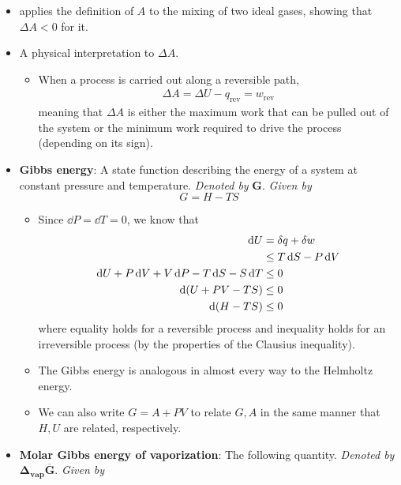 \documentclass[../notes.tex]{subfiles}
\begin{document}
\begin{itemize}
\begin{itemize}
    \end{itemize}
    \item \textcite{bib:McQuarrieSimon} applies the definition of $A$ to the mixing of two ideal gases, showing that $\Delta A<0$ for it.
    \item A physical interpretation to $\Delta A$.
    \begin{itemize}
        \item When a process is carried out along a reversible path,
        \begin{align*}
            \Delta A = \Delta U-q_\text{rev} = w_\text{rev}
        \end{align*}
        meaning that $\Delta A$ is either the maximum work that can be pulled out of the system or the minimum work required to drive the process (depending on its sign).
    \end{itemize}
    \item \textbf{Gibbs energy}: A state function describing the energy of a system at constant pressure and temperature. \emph{Denoted by} $\bm{G}$. \emph{Given by}
    \begin{equation*}
        G = H-TS
    \end{equation*}
    \begin{itemize}
        \item Since $\dd{P}=\dd{T}=0$, we know that
        \begin{align*}
            \dd{U} &= \var{q}+\var{w}\\
            &\leq T\dd{S}-P\dd{V}\\
            \dd{U}+P\dd{V}+V\dd{P}-T\dd{S}-S\dd{T} &\leq 0\\
            \dd{(U+PV-TS)} &\leq 0\\
            \dd{(H-TS)} &\leq 0
        \end{align*}
        where equality holds for a reversible process and inequality holds for an irreversible process (by the properties of the Clausius inequality).
        \item The Gibbs energy is analogous in almost every way to the Helmholtz energy.
        \item We can also write $G=A+PV$ to relate $G,A$ in the same manner that $H,U$ are related, respectively.
    \end{itemize}
    \item \textbf{Molar Gibbs energy of vaporization}: The following quantity. \emph{Denoted by} $\bm{\Delta_\textbf{vap}\overline{G}}$. \emph{Given by}
    \begin{equation*}

\end{equation*}
\end{itemize}
\end{document}

